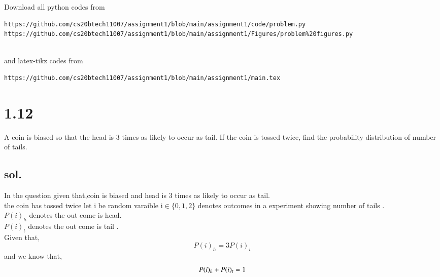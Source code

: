 \documentclass[journal,12pt,twocolumn]{IEEEtran}
\begin{document}
\maketitle
\newpage
\bigskip
\renewcommand{\thefigure}{\theenumi}
\renewcommand{\thetable}{\theenumi}
Download all python codes from 
\begin{lstlisting}
https://github.com/cs20btech11007/assignment1/blob/main/assignment1/code/problem.py
https://github.com/cs20btech11007/assignment1/blob/main/assignment1/Figures/problem%20figures.py


\end{lstlisting}
%
and latex-tikz codes from 
%
\begin{lstlisting}
https://github.com/cs20btech11007/assignment1/blob/main/assignment1/main.tex

\end{lstlisting}
\section*{1.12}A coin is biased so that the head is 3 times
as likely to occur as tail. If the coin is tossed
twice, find the probability distribution of
number of tails.\\

\subsection*{sol.}
 In the question given that,coin is biased and head is 3 times as likely to occur as tail.\\
the coin has tossed twice 
let i be random varaible i$\in\{0,1,2 \}$ denotes outcomes  in a experiment showing number of tails .\\
$P(i)_h$   denotes the out come is head.\\
$P(i)_t$    denotes the out come is tail .\\
Given that,$$P(i)_h=3P(i)_i$$
and we know that,
\begin{equation}
 P(i)_{h} +P(i)_{t}=1\\
\end{equation}\\
\end{document}
